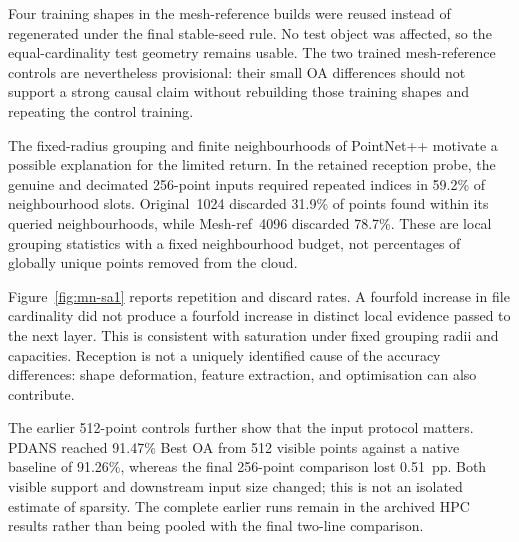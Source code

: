 Four training shapes in the mesh-reference builds were reused instead of
regenerated under the final stable-seed rule. No test object was affected,
so the equal-cardinality test geometry remains usable. The two trained
mesh-reference controls are nevertheless provisional: their small OA
differences should not support a strong causal claim without rebuilding
those training shapes and repeating the control training.


The fixed-radius grouping and finite neighbourhoods of PointNet++ \cite{qi2017pointnetpp} motivate a possible explanation for the limited return. In the retained reception probe, the genuine and
decimated 256-point inputs required repeated indices in 59.2\% of
neighbourhood slots. Original~1024 discarded 31.9\% of points found
within its queried neighbourhoods, while Mesh-ref~4096 discarded 78.7\%.
These are local grouping statistics with a fixed neighbourhood budget,
not percentages of globally unique points removed from the cloud.

Figure~\ref{fig:mn-sa1} reports repetition and discard rates. A fourfold
increase in file cardinality did not produce a fourfold increase in distinct
local evidence passed to the next layer. This is consistent with saturation
under fixed grouping radii and capacities. Reception is not a uniquely
identified cause of the accuracy differences: shape deformation, feature
extraction, and optimisation can also contribute.


The earlier 512-point controls further show that the input protocol matters.
PDANS reached 91.47\% Best OA from 512 visible points against a native
baseline of 91.26\%, whereas the final 256-point comparison lost
0.51~pp. Both visible support and downstream input size changed;
this is not an isolated estimate of sparsity. The complete earlier
runs remain in the archived HPC results rather than being pooled
with the final two-line comparison.

